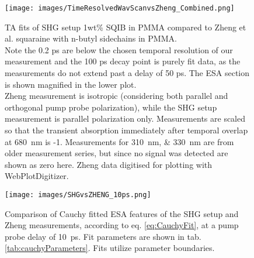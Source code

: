 \documentclass[twoside,openright,listof=numbered]{scrreprt}
\begin{document}
\begin{figure}[hbtp]
\centering
\texttt{[image: images/TimeResolvedWavScanvsZheng\_Combined.png]}
\caption[TA fits of SHG setup 1wt\% SQIB in PMMA compared to Zheng et al.\protect\cite{Zheng2020} squaraine with n-butyl sidechains in PMMA.]{TA fits of SHG setup 1wt\% SQIB in PMMA compared to Zheng et al.\protect\cite{Zheng2020} squaraine with n-butyl sidechains in PMMA.\\ Note the 0.2 ps are below the chosen temporal resolution of our measurement and the 100 ps decay point is purely fit data, as the measurements do not extend past a delay of 50 ps. The ESA section is shown magnified in the lower plot.\\
Zheng measurement is isotropic (considering both parallel and orthogonal pump probe polarization), while the SHG setup measurement is parallel polarization only. Measurements are scaled so that the transient absorption immediately after temporal overlap at \SI{680}{\nano\meter} is -1. Measurements for \SIlist{310;330}{\nano\meter} are from older measurement series, but since no signal was detected are shown as zero here. Zheng data digitised for plotting with WebPlotDigitizer.\cite{Rohatgi2022}\label{fig:TA_vsZheng}}
\end{figure}

\begin{figure}[hbtp]
\centering
\texttt{[image: images/SHGvsZHENG\_10ps.png]} 
\caption[Comparison of Cauchy fitted ESA features with literature.]{Comparison of Cauchy fitted ESA features of the SHG setup and Zheng measurements, according to eq. \ref{eq:CauchyFit}, at a pump probe delay of \qty{10}{\pico\second}. Fit parameters are shown in tab. \ref{tab:cauchyParameters}. Fits utilize parameter boundaries.\label{fig:cauchyCompZhengSHG}}
\end{figure}

\end{document}
